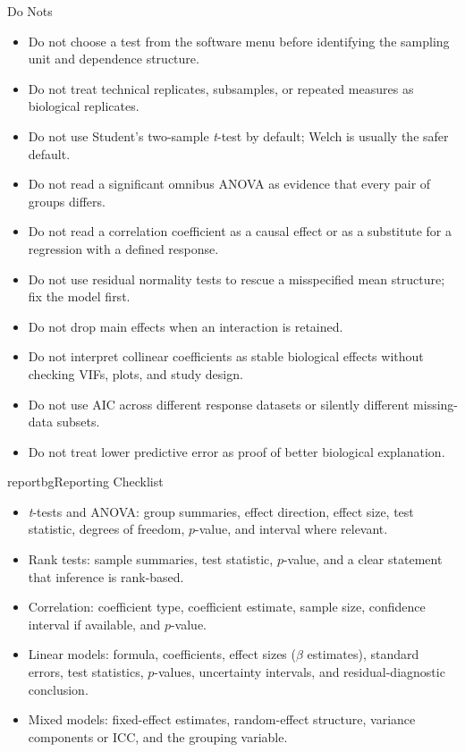 \documentclass[9pt,landscape]{extarticle}
\newlength{\tableblockwidth}
\begin{document}
\begin{minipage}{\tableblockwidth}
\begin{tcbraster}[
  raster columns=3,
  raster equal height=rows,
  raster column skip=4mm,
  raster left skip=0pt,
  raster right skip=0pt
]
\begin{warnpanelbox}{Do Nots}
\begin{itemize}[leftmargin=*, itemsep=2pt, topsep=2pt]
\item Do not choose a test from the software menu before identifying the sampling unit and dependence structure.
\item Do not treat technical replicates, subsamples, or repeated measures as biological replicates.
\item Do not use Student's two-sample \textit{t}-test by default; Welch is usually the safer default.
\item Do not read a significant omnibus ANOVA as evidence that every pair of groups differs.
\item Do not read a correlation coefficient as a causal effect or as a substitute for a regression with a defined response.
\item Do not use residual normality tests to rescue a misspecified mean structure; fix the model first.
\item Do not drop main effects when an interaction is retained.
\item Do not interpret collinear coefficients as stable biological effects without checking VIFs, plots, and study design.
\item Do not use AIC across different response datasets or silently different missing-data subsets.
\item Do not treat lower predictive error as proof of better biological explanation.
\end{itemize}
\end{warnpanelbox}
\begin{infopanelbox}{reportbg}{Reporting Checklist}
\begin{itemize}[leftmargin=*, itemsep=2pt, topsep=2pt]
\item \textit{t}-tests and ANOVA: group summaries, effect direction, effect size, test statistic, degrees of freedom, \(p\)-value, and interval where relevant.
\item Rank tests: sample summaries, test statistic, \(p\)-value, and a clear statement that inference is rank-based.
\item Correlation: coefficient type, coefficient estimate, sample size, confidence interval if available, and \(p\)-value.
\item Linear models: formula, coefficients, effect sizes (\(\beta\) estimates), standard errors, test statistics, \(p\)-values, uncertainty intervals, and residual-diagnostic conclusion.
\item Mixed models: fixed-effect estimates, random-effect structure, variance components or ICC, and the grouping variable.

\end{itemize}
\end{infopanelbox}
\end{tcbraster}
\end{minipage}
\end{document}
